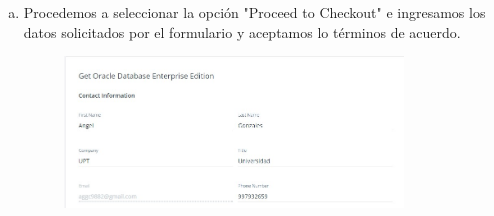 \documentclass[preprint,12pt]{elsarticle}
\begin{document}
\begin{enumerate}[a)]
\item Procedemos a seleccionar la opción "Proceed to Checkout" e ingresamos los datos solicitados por el formulario y aceptamos lo términos de acuerdo.
\begin{figure}[htb]
	\begin{center}
		\includegraphics[width=9cm]{./IMAGENES/Docker8_03}
	\end{center}
\end{figure}


\end{enumerate}
\end{document}
